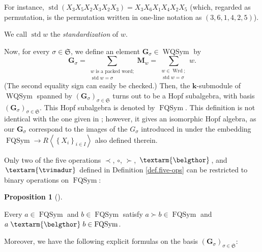 \documentclass
[numbers=enddot,12pt,final,onecolumn,notitlepage,abstracton]{scrartcl}%
\theoremstyle{definition}
\newtheorem{prop}[theo]{Proposition}
\newenvironment{proposition}[1][]
{\begin{prop}[#1]\begin{leftbar}}
{\end{leftbar}\end{prop}}
\newcommand{\tvi}{\left. \textarm{\tvimadur} \right.}
\newcommand{\bel}{\left. \textarm{\belgthor} \right.}
\let\sumnonlimits\sum
\renewcommand{\sum}{\sumnonlimits\limits}
\begin{document}
For instance, $\operatorname*{std}\left(  X_{3}X_{5}X_{2}X_{3}X_{2}%
X_{3}\right)  =X_{3}X_{6}X_{1}X_{4}X_{2}X_{5}$ (which, regarded as
permutation, is the permutation written in one-line notation as $\left(
3,6,1,4,2,5\right)  $).

We call $\operatorname*{std}w$ the \textit{standardization} of $w$.

Now, for every $\sigma\in\mathfrak{S}$, we define an element $\mathbf{G}%
_{\sigma}\in\operatorname*{WQSym}$ by%
\[
\mathbf{G}_{\sigma}=\sum_{\substack{w\text{ is a packed word;}%
\\\operatorname*{std}w=\sigma}}\mathbf{M}_{w}=\sum_{\substack{w\in
\operatorname*{Wrd};\\\operatorname*{std}w=\sigma}}w.
\]
(The second equality sign can easily be checked.) Then, the $\mathbf{k}%
$-submodule of $\operatorname*{WQSym}$ spanned by $\left(  \mathbf{G}_{\sigma
}\right)  _{\sigma\in\mathfrak{S}}$ turns out to be a Hopf subalgebra, with
basis $\left(  \mathbf{G}_{\sigma}\right)  _{\sigma\in\mathfrak{S}}$. This
Hopf subalgebra is denoted by $\operatorname*{FQSym}$. This definition is not
identical with the one given in \cite[Section 8.1]{Reiner}; however, it gives
an isomorphic Hopf algebra, as our $\mathbf{G}_{\sigma}$ correspond to the
images of the $G_{\sigma}$ introduced in \cite[Section 8.1]{Reiner} under the
embedding $\operatorname*{FQSym}\rightarrow R\left\langle \left\{
X_{i}\right\}  _{i\in I}\right\rangle $ also defined therein.

Only two of the five operations $\left.  \prec\right.  $, $\circ$, $\left.
\succ\right.  $, $\bel $, and $\tvi $ defined in Definition \ref{def.five-ops}
can be restricted to binary operations on $\operatorname*{FQSym}$:

\begin{proposition}
\label{prop.FQSym.closed}Every $a\in\operatorname*{FQSym}$ and $b\in
\operatorname*{FQSym}$ satisfy $a\left.  \succ\right.  b\in
\operatorname*{FQSym}$ and $a \bel b\in\operatorname*{FQSym}$.
\end{proposition}

Moreover, we have the following explicit formulas on the basis $\left(
\mathbf{G}_{\sigma}\right)  _{\sigma\in\mathfrak{S}}$:
\end{document}
